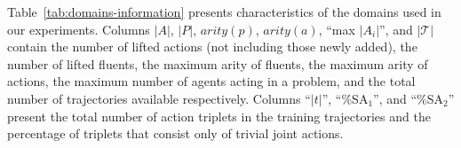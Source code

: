 \documentclass[letterpaper]{article} %
\theoremstyle{definition}
\theoremstyle{remark}
\newcommand{\roni}[1]{{\textcolor{red}{[Roni: #1]}}}
\begin{document}
Table~\ref{tab:domains-information} presents characteristics of the domains used in our experiments.
Columns $|A|$, $|P|$, $arity(p)$, $arity(a)$, ``max $|A_i|$'', and $|\mathcal{T}|$ contain the number of lifted actions (not including those newly added), the number of lifted fluents,  the maximum arity of fluents, the maximum arity of actions, the maximum number of agents acting in a problem, and the total number of trajectories available respectively.
Columns ``$|t|$'', ``\%SA$_1$'', and ``\%SA$_2$'' present the total number of action triplets in the training trajectories and the percentage of triplets that consist only of trivial joint actions.

\end{document}
